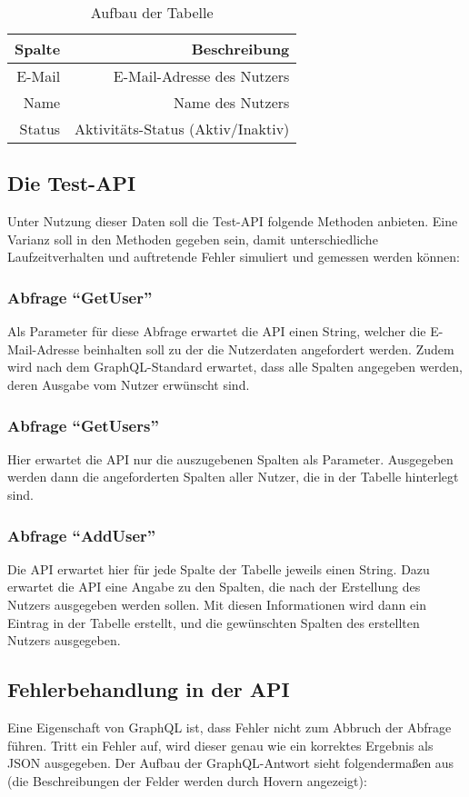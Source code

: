 \begin{table}[hbt]
\centering
\begin{minipage}[t]{.5\textwidth} %
\caption{Aufbau der Tabelle} %
\begin{tabularx}{\columnwidth}{rr}
\toprule
Spalte & Beschreibung\\
\midrule
E-Mail & E-Mail-Adresse des Nutzers\\
Name   & Name des Nutzers\\
Status & Aktivitäts-Status (Aktiv/Inaktiv)\\
\bottomrule
\end{tabularx}
\label{tab:pin}
\end{minipage}
\end{table}
\subsection{Die Test-API}
Unter Nutzung dieser Daten soll die Test-API folgende Methoden anbieten. Eine Varianz soll in den Methoden gegeben sein, damit unterschiedliche Laufzeitverhalten und auftretende Fehler simuliert und gemessen werden können:
\subsubsection{Abfrage ``GetUser''}
Als Parameter für diese Abfrage erwartet die API einen String, welcher die E-Mail-Adresse beinhalten soll zu der die Nutzerdaten angefordert werden. Zudem wird nach dem GraphQL-Standard erwartet, dass alle Spalten angegeben werden, deren Ausgabe vom Nutzer erwünscht sind.
\subsubsection{Abfrage ``GetUsers''}
Hier erwartet die API nur die auszugebenen Spalten als Parameter. Ausgegeben werden dann die angeforderten Spalten aller Nutzer, die in der Tabelle hinterlegt sind.
\subsubsection{Abfrage ``AddUser''}
Die API erwartet hier für jede Spalte der Tabelle jeweils einen String. Dazu erwartet die API eine Angabe zu den Spalten, die nach der Erstellung des Nutzers ausgegeben werden sollen.  Mit diesen Informationen wird dann ein Eintrag in der Tabelle erstellt, und die gewünschten Spalten des erstellten Nutzers ausgegeben.
\subsection{Fehlerbehandlung in der API}
Eine Eigenschaft von GraphQL ist, dass Fehler nicht zum Abbruch der Abfrage führen. Tritt ein Fehler auf, wird dieser genau wie ein korrektes Ergebnis als JSON ausgegeben. \cite{Porcello2018b} Der Aufbau der GraphQL-Antwort sieht folgendermaßen aus (die Beschreibungen der Felder werden durch Hovern angezeigt): 

